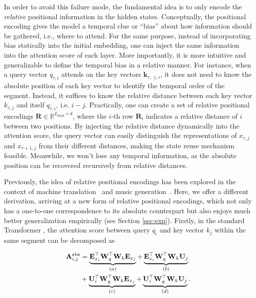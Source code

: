 \documentclass[11pt,a4paper]{article}
\def\rvk{{\mathbf{k}}}
\def\rmA{{\mathbf{A}}}
\def\rmE{{\mathbf{E}}}
\def\rmR{{\mathbf{R}}}
\def\rmU{{\mathbf{U}}}
\def\rmW{{\mathbf{W}}}
\newcommand{\R}{\mathbb{R}}
\begin{document}
In order to avoid this failure mode, the fundamental idea is to only encode the \textit{relative} positional information in the hidden states.
Conceptually, the positional encoding gives the model a temporal clue or ``bias'' about how information should be gathered, i.e., where to attend.
For the same purpose, instead of incorporating bias statically into the initial embedding, one can inject the same information into the attention score of each layer.
More importantly, it is more intuitive and generalizable to define the temporal bias in a relative manner.
For instance, when a query vector $q_{\tau,i}$ attends on the key vectors $\rvk_{\tau,\leq i}$, it does not need to know the absolute position of each key vector to identify the temporal order of the segment.
Instead, it suffices to know the relative distance between each key vector $k_{\tau,j}$ and itself $q_{\tau,i}$, i.e. $i - j$. Practically, one can create a set of relative positional encodings $\rmR \in \R^{L_\text{max} \times d}$, where the $i$-th row $\rmR_i$ indicates a relative distance of $i$ between two positions.
By injecting the relative distance dynamically into the attention score, the query vector can easily distinguish the representations of $x_{\tau,j}$ and $x_{\tau+1,j}$ from their different distances, making the state reuse mechanism feasible.
Meanwhile, we won't lose any temporal information, as the absolute position can be recovered recursively from relative distances.

Previously, the idea of relative positional encodings has been explored in the context of machine translation~\citep{shaw2018self} and music generation~\citep{huang2018improved}.
Here, we offer a different derivation, arriving at a new form of relative positional encodings, which not only has a one-to-one correspondence to its absolute counterpart but also enjoys much better generalization empirically (see Section \ref{sec:exp}).
Firstly, in the standard Transformer \citep{vaswani2017attention}, the attention score between query $q_i$ and key vector $k_j$ within the same segment can be decomposed as
\par\nobreak
\vspace{-0.5em}
\small
\begin{align*}
	\rmA_{i,j}^\text{abs} &= \underbrace{ \rmE_{x_i}^\top \rmW_q^\top \rmW_k \rmE_{x_j} }_{(a)}
	+ \underbrace{\rmE_{x_i}^\top \rmW_q^\top \rmW_k \rmU_{j}}_{(b)} \\
	&+ \underbrace{\rmU_{i}^\top \rmW_q^\top \rmW_k \rmE_{x_j}}_{(c)}
	+ \underbrace{\rmU_{i}^\top \rmW_q^\top \rmW_k \rmU_{j}}_{(d)}. \vspace{-0.5em}
\end{align*}
\normalsize
\vspace{-1em}
\end{document}
